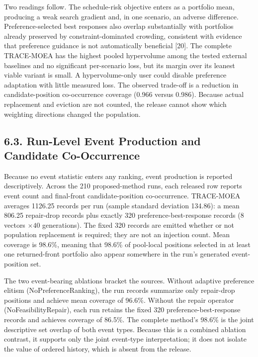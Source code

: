\documentclass[
  10pt,
  a4paper,
]{article}
\begin{document}
Two readings follow. The schedule-risk objective enters as a portfolio
mean, producing a weak search gradient and, in one scenario, an adverse
difference. Preference-selected best responses also overlap
substantially with portfolios already preserved by constraint-dominated
crowding, consistent with evidence that preference guidance is not
automatically beneficial {[}20{]}. The complete TRACE-MOEA has the
highest pooled hypervolume among the tested external baselines and no
significant per-scenario loss, but its margin over its leanest viable
variant is small. A hypervolume-only user could disable preference
adaptation with little measured loss. The observed trade-off is a
reduction in candidate-position co-occurrence coverage (0.966 versus
0.986). Because actual replacement and eviction are not counted, the
release cannot show which weighting directions changed the population.

\subsection{6.3. Run-Level Event Production and Candidate
Co-Occurrence}\label{run-level-event-production-and-candidate-co-occurrence}

Because no event statistic enters any ranking, event production is
reported descriptively. Across the 210 proposed-method runs, each
released row reports event count and final-front candidate-position
co-occurrence. TRACE-MOEA averages 1126.25 records per run (sample
standard deviation 134.86): a mean 806.25 repair-drop records plus
exactly 320 preference-best-response records (\(8\) vectors \(\times40\)
generations). The fixed 320 records are emitted whether or not
population replacement is required; they are not an injection count.
Mean coverage is 98.6\%, meaning that 98.6\% of pool-local positions
selected in at least one returned-front portfolio also appear somewhere
in the run's generated event-position set.

The two event-bearing ablations bracket the sources. Without adaptive
preference elitism (NoPreferenceRanking), the run records summarize only
repair-drop positions and achieve mean coverage of 96.6\%. Without the
repair operator (NoFeasibilityRepair), each run retains the fixed 320
preference-best-response records and achieves coverage of 86.5\%. The
complete method's 98.6\% is the joint descriptive set overlap of both
event types. Because this is a combined ablation contrast, it supports
only the joint event-type interpretation; it does not isolate the value
of ordered history, which is absent from the release.
\end{document}
